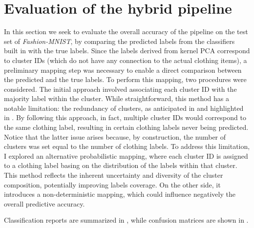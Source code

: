 \section{Evaluation of the hybrid pipeline}\label{hybrid_pipeline_evaluation}
In this section we seek to evaluate the overall accuracy of the pipeline on the test set of \emph{Fashion-MNIST}, by 
comparing the predicted labels from the classifiers built in  with the true labels. Since the labels derived 
from kernel PCA correspond to cluster IDs (which do not have any connection to the actual clothing items), a preliminary mapping step 
was necessary to enable a direct comparison between the predicted and the true labels. To perform this mapping, two procedures were considered. 
The initial approach involved associating each cluster ID with the majority label within the cluster. While straightforward, this method has
a notable limitation: the redundancy of clusters, as anticipated in  and highlighted in . 
By following this approach, in fact, multiple cluster IDs would correspond to the same clothing label, resulting in certain clothing labels never 
being predicted. Notice that the latter issue arises because, by construction, the number of clusters was set equal to the number of clothing
labels. To address this limitation, I explored an alternative probabilistic mapping, where each cluster ID is assigned
to a clothing label basing on the distribution of the labels within that cluster. This method reflects the inherent uncertainty and diversity 
of the cluster composition, potentially improving labels coverage. On the other side, it introduces a non-deterministic mapping, 
which could influence negatively the overall predictive accuracy.

Classification reports are summarized in , while confusion matrices
are shown in .
\newpage

